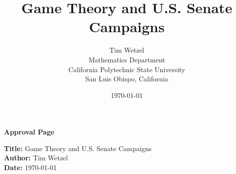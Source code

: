 \documentclass[11pt]{article}
\begin{document}

\title{Game Theory and U.S. Senate Campaigns}

\author{
Tim Wetzel \\[30eM]
Mathematics Department \\
California Polytechnic State University\\
San Luis Obispo, California\\
}

\date{\today}

\maketitle

\newpage

\mbox{}

\vfill

\begin{center}
\textbf{Approval Page}
\end{center}

\vfill

\begin{flushleft}
\textbf{Title:}
Game Theory and U.S. Senate Campaigns
\\[10ex]

\textbf{Author:} Tim Wetzel \\[10ex]

\textbf{Date:} \today \\[20ex]
\end{flushleft}

\vfill
\end{document}
